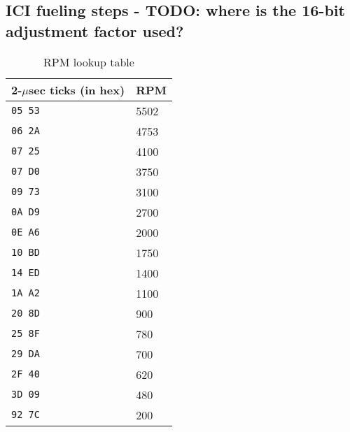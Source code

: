 \documentclass[11pt,twocolumn]{scrartcl}
\begin{document}
\subsection{ICI fueling steps - TODO: where is the 16-bit adjustment factor used? \label{section:Fuelingsteps}}
\begin{table*}
 \centering
 \begin{tabular}{|l|l|}
  \hline
  \bfseries{2-$\mu$sec ticks (in hex)} & \bfseries{RPM} \\ \hline
  \texttt{05 53} & 5502 \\ \hline
  \texttt{06 2A} & 4753 \\ \hline
  \texttt{07 25} & 4100 \\ \hline
  \texttt{07 D0} & 3750 \\ \hline
  \texttt{09 73} & 3100 \\ \hline
  \texttt{0A D9} & 2700 \\ \hline
  \texttt{0E A6} & 2000 \\ \hline
  \texttt{10 BD} & 1750 \\ \hline
  \texttt{14 ED} & 1400 \\ \hline
  \texttt{1A A2} & 1100 \\ \hline
  \texttt{20 8D} & 900  \\ \hline
  \texttt{25 8F} & 780  \\ \hline
  \texttt{29 DA} & 700  \\ \hline
  \texttt{2F 40} & 620  \\ \hline
  \texttt{3D 09} & 480  \\ \hline
  \texttt{92 7C} & 200  \\ \hline  
 \end{tabular}
 \caption{RPM lookup table\label{tab:RPMlookup}}
\end{table*}
\end{document}
